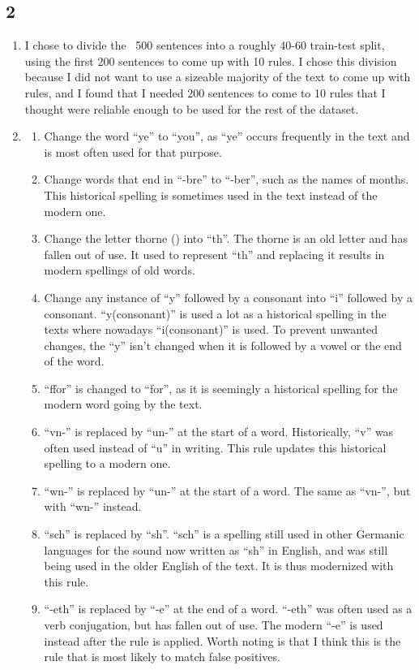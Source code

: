 \documentclass{article}
\begin{document}
\subsection{2}
\begin{enumerate}
    \item I chose to divide the ~500 sentences into a roughly 40-60 train-test split, using the first 200 sentences to come up with 10 rules. I chose this division because I did not want to use a sizeable majority of the text to come up with rules, and I found that I needed 200 sentences to come to 10 rules that I thought were reliable enough to be used for the rest of the dataset.
    \item \begin{enumerate}
        \item Change the word ``ye'' to ``you'', as ``ye'' occurs frequently in the text and is most often used for that purpose.
        \item Change words that end in ``-bre'' to ``-ber'', such as the names of months. This historical spelling is sometimes used in the text instead of the modern one.
        \item Change the letter thorne (\TH) into ``th''. The thorne is an old letter and has fallen out of use. It used to represent ``th'' and replacing it results in modern spellings of old words.
        \item Change any instance of ``y'' followed by a consonant into ``i'' followed by a consonant. ``y(consonant)'' is used a lot as a historical spelling in the texts where nowadays ``i(consonant)'' is used. To prevent unwanted changes, the ``y'' isn't changed when it is followed by a vowel or the end of the word.
        \item ``ffor'' is changed to ``for'', as it is seemingly a historical spelling for the modern word going by the text.
        \item ``vn-'' is replaced by ``un-'' at the start of a word. Historically, ``v'' was often used instead of ``u'' in writing. This rule updates this historical spelling to a modern one.
        \item ``wn-'' is replaced by ``un-'' at the start of a word. The same as ``vn-'', but with ``wn-'' instead.
        \item ``sch'' is replaced by ``sh''. ``sch'' is a spelling still used in other Germanic languages for the sound now written as ``sh'' in English, and was still being used in the older English of the text. It is thus modernized with this rule.
        \item ``-eth'' is replaced by ``-e'' at the end of a word. ``-eth'' was often used as a verb conjugation, but has fallen out of use. The modern ``-e'' is used instead after the rule is applied. Worth noting is that I think this is the rule that is most likely to match false positives.

\end{enumerate}
\end{enumerate}
\end{document}
